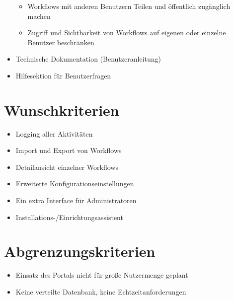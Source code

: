 \begin{itemize}
				    \begin{itemize}
				        \item Workflows mit anderen Benutzern Teilen und öffentlich zugänglich machen
				        \item Zugriff und Sichtbarkeit von Workflows auf eigenen oder einzelne Benutzer beschränken
				    \end{itemize}
				\item Technische Dokumentation (Benutzeranleitung)
				\item Hilfesektion für Benutzerfragen
			\end{itemize}
		
		\section{Wunschkriterien}
			\begin{itemize}
				\item Logging aller Aktivitäten
				\item Import und Export von Workflows
				\item Detailansicht einzelner Workflows
				\item Erweiterte Konfigurationseinstellungen
				\item Ein extra Interface für Administratoren%
				\item Installations-/Einrichtungsassistent
			\end{itemize}	
		
		\section{Abgrenzungskriterien}
			\begin{itemize}
				\item Einsatz des Portals nicht für große Nutzermenge geplant
				\item Keine verteilte Datenbank, keine Echtzeitanforderungen
			\end{itemize}	



